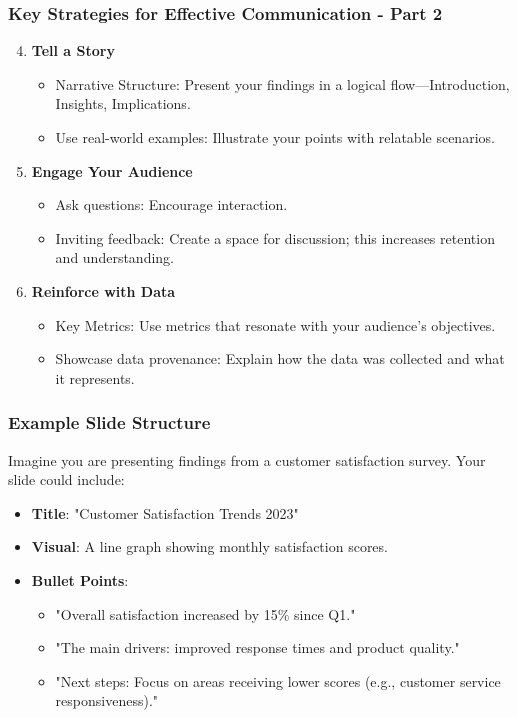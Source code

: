\documentclass{beamer}
\begin{document}
\begin{frame}[fragile]
    \frametitle{Key Strategies for Effective Communication - Part 2}
    \begin{enumerate}
        \setcounter{enumi}{3}
        \item \textbf{Tell a Story}
        \begin{itemize}
            \item Narrative Structure: Present your findings in a logical flow—Introduction, Insights, Implications.
            \item Use real-world examples: Illustrate your points with relatable scenarios.
        \end{itemize}
        
        \item \textbf{Engage Your Audience}
        \begin{itemize}
            \item Ask questions: Encourage interaction.
            \item Inviting feedback: Create a space for discussion; this increases retention and understanding.
        \end{itemize}
        
        \item \textbf{Reinforce with Data}
        \begin{itemize}
            \item Key Metrics: Use metrics that resonate with your audience’s objectives.
            \item Showcase data provenance: Explain how the data was collected and what it represents.
        \end{itemize}
    \end{enumerate}
\end{frame}

\begin{frame}[fragile]
    \frametitle{Example Slide Structure}
    Imagine you are presenting findings from a customer satisfaction survey. Your slide could include:
    \begin{itemize}
        \item \textbf{Title}: "Customer Satisfaction Trends 2023"
        \item \textbf{Visual}: A line graph showing monthly satisfaction scores.
        \item \textbf{Bullet Points}:
        \begin{itemize}
            \item "Overall satisfaction increased by 15\% since Q1."
            \item "The main drivers: improved response times and product quality."
            \item "Next steps: Focus on areas receiving lower scores (e.g., customer service responsiveness)."
        \end{itemize}
    \end{itemize}
\end{frame}
\end{document}
